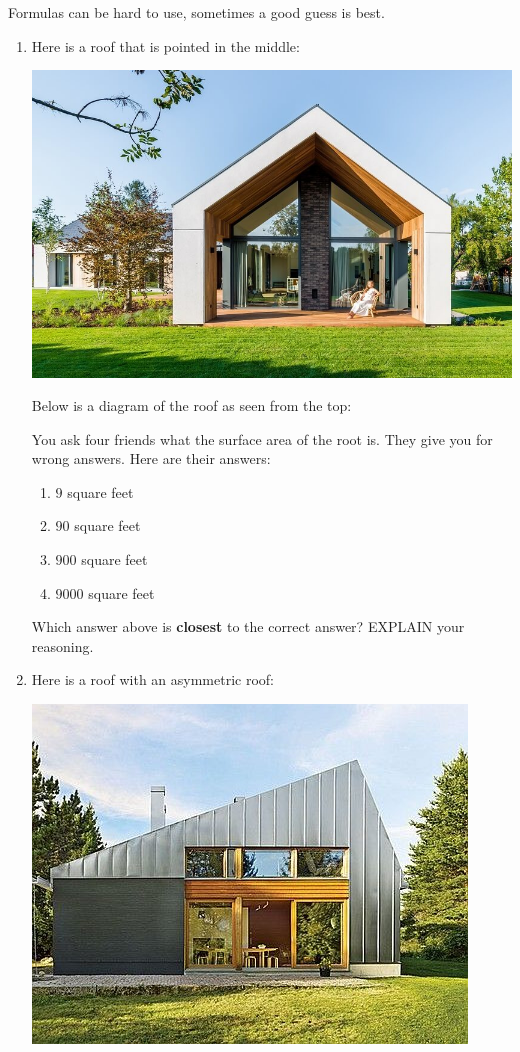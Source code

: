 \documentclass[nooutcomes,noauthor,hints]{ximera}
\begin{document}
\begin{question}
  Formulas can be hard to use, sometimes a good guess is best.
  \begin{enumerate}
  \item Here is a roof that is pointed in the middle:
  \begin{center}
    \includegraphics[width=.6\textwidth]{symRoof.jpg}
  \end{center}
  Below is a diagram of the roof as seen from the top:
  \begin{center}
  \end{center}
  You ask four friends what the surface area of the root is. They give
  you for wrong answers. Here are their answers:
    \begin{enumerate}
    \item $9$ square feet
    \item $90$ square feet
    \item $900$ square feet
    \item $9000$ square feet
    \end{enumerate}
    Which answer above is \textbf{closest} to the correct answer? EXPLAIN your reasoning.
  \item Here is a roof with an asymmetric roof:
  \begin{center}
    \includegraphics[width=.6\textwidth]{skewRoof.jpg}

\end{center}
\end{enumerate}
\end{question}
\end{document}
